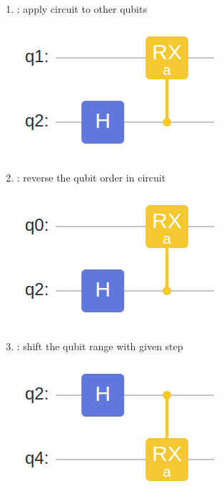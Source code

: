 \begin{enumerate}
\begin{minipage}{\linewidth}
          \end{minipage}
    \item {} : apply circuit to other qubits\par
          \begin{minipage}{\linewidth}
              \centering
              \includegraphics[width=0.6\linewidth]{images/2_4_apply_circ.png}
          \end{minipage}
    \item {} : reverse the qubit order in circuit\par
          \begin{minipage}{\linewidth}
              \centering
              \includegraphics[width=0.6\linewidth]{images/2_4_reverse_circ.png}
          \end{minipage}
    \item {} : shift the qubit range with given step\par
          \begin{minipage}{\linewidth}
              \centering
              \includegraphics[width=0.6\linewidth]{images/2_4_shift_circ.png}
          \end{minipage}
\end{enumerate}
